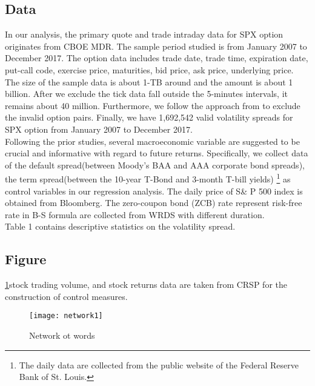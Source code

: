 \subsection{Data}
In our analysis, the primary quote and trade intraday data for SPX option originates from CBOE MDR. The sample period studied is from January 2007 to December 2017. The option data includes trade date, trade time, expiration date, put-call code, exercise price, maturities, bid price, ask price, underlying price. The size of the sample data is about 1-TB around and the amount is about 1 billion. After we exclude the tick data fall outside the 5-minutes intervals, it remains about 40 million. Furthermore, we follow the approach from \cite{ofek2004limited} to exclude the invalid option pairs. Finally, we have 1,692,542 valid volatility spreads for SPX option from January 2007 to December 2017. 
\\

Following the prior studies\parencite{bollerslev2009expected}, several macroeconomic variable are suggested to be crucial and informative with regard to future returns. Specifically, we collect data of the default spread(between Moody's BAA and AAA corporate bond spreads), the term spread(between the 10-year T-Bond and 3-month T-bill yields) \footnote{The daily data are collected from the public website of the Federal Reserve Bank of St. Louis.} as control variables in our regression analysis. 
The daily price of S\& P 500 index is obtained from Bloomberg. The zero-coupon bond (ZCB) rate represent risk-free rate in B-S formula are collected from WRDS with different duration. 
\\

Table 1 contains descriptive statistics on the volatility spread. 


\subsection{Figure}
\ref{fig:Network}stock trading volume, and stock returns data are taken from CRSP for the construction of control measures.

\begin{figure}[h]
\centering
\texttt{[image: network1]}
\caption{Network ot words}
\label{fig:Network}
\end{figure}


